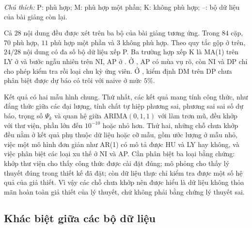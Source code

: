 {\footnotesize\textit{Chú thích:} P: phù hợp; M: phù hợp một phần; K: không phù hợp; --: bộ dữ liệu của bài giảng còn lại.}

Cả $28$ nội dung đều được xét trên ba bộ của bài giảng tương ứng. Trong $84$ cặp, $70$ phù hợp, $11$ phù hợp một phần và $3$ không phù hợp. Theo quy tắc gộp ở trên, $24/28$ nội dung có đa số bộ dữ liệu xếp P. Ba trường hợp xếp K là MA(1) trên LY ở  và bước ngẫu nhiên trên NI, AP ở . Ở , AP có mùa vụ rõ, còn NI và DP chỉ cho phép kiểm tra rồi loại chu kỳ ứng viên. Ở , kiểm định DM trên DP chưa phân biệt được dự báo có trôi với naive ở mức $5\%$.

Kết quả có hai mẫu hình chung. Thứ nhất, các kết quả mang tính công thức, như đẳng thức giữa các đại lượng, tính chất tự hiệp phương sai, phương sai sai số dự báo, trọng số $\Psi_k$ và quan hệ giữa ARIMA$(0,1,1)$ với làm trơn mũ, đều khớp với thư viện, phần lớn đến $10^{-10}$ hoặc nhỏ hơn. Thứ hai, những chỗ chưa khớp đều nằm ở kết quả phụ thuộc dữ liệu hoặc cỡ mẫu, gồm ước lượng ở mẫu nhỏ, việc một mô hình đơn giản như AR(1) có mô tả được HU và LY hay không, và việc phân biệt các loại xu thế ở NI và AP. Cần phân biệt ba loại bằng chứng: khớp thư viện cho thấy công thức được cài đặt đúng; mô phỏng cho thấy lý thuyết đúng trong thiết kế đã đặt; còn dữ liệu thực chỉ kiểm tra được một số hệ quả của giả thiết. Vì vậy các chỗ chưa khớp nên được hiểu là dữ liệu không thỏa mãn hoàn toàn giả thiết của lý thuyết, chứ không phải bằng chứng lý thuyết sai.

\subsection{Khác biệt giữa các bộ dữ liệu}

